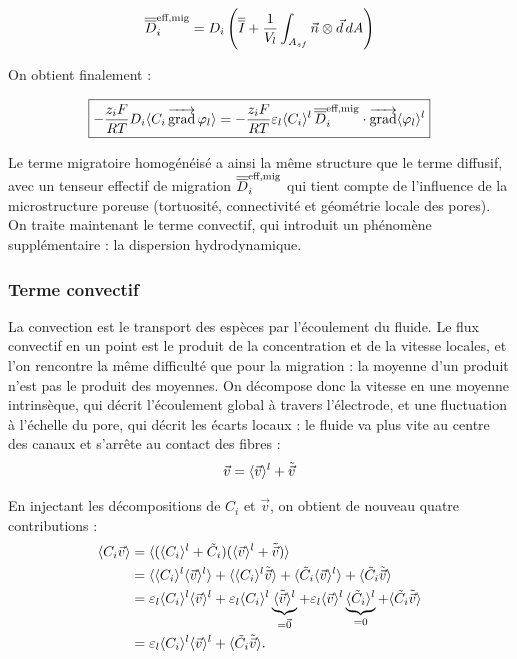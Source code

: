 \begin{equation}
\overline{\overline{D}}_i^{\text{eff,mig}} = D_i \left(\overline{\overline{I}} + \frac{1}{V_l}\int_{A_{sf}} \vec{n}\otimes\vec{d}\, dA \right)
\end{equation}

On obtient finalement :

\begin{equation}
\boxed{-\frac{z_i F}{RT} D_i \langle C_i \mathop{\overrightarrow{\operatorname{grad}}}\nolimits\varphi_l \rangle
= -\frac{z_i F}{RT} \varepsilon_l \langle C_i \rangle^l\, \overline{\overline{D}}_i^{\text{eff,mig}}\cdot\mathop{\overrightarrow{\operatorname{grad}}}\nolimits\langle \varphi_l \rangle^l}
\label{eq:mig_eff}
\end{equation}

Le terme migratoire homogénéisé a ainsi la même structure que le terme
diffusif, avec un tenseur effectif de migration $\overline{\overline{D}}_i^{\text{eff,mig}}$
qui tient compte de l'influence de la microstructure poreuse
(tortuosité, connectivité et géométrie locale des pores). On traite maintenant
le terme convectif, qui introduit un phénomène supplémentaire :
la dispersion hydrodynamique.
\subsubsection*{Terme convectif}

La convection est le transport des espèces par l'écoulement du fluide. Le
flux convectif en un point est le produit de la concentration et de la
vitesse locales, et l'on rencontre la même difficulté que pour la migration :
la moyenne d'un produit n'est pas le produit des moyennes. On décompose donc
la vitesse en une moyenne intrinsèque, qui décrit l'écoulement global à
travers l'électrode, et une fluctuation à l'échelle du pore, qui décrit les
écarts locaux : le fluide va plus vite au centre des canaux et s'arrête au
contact des fibres :
\begin{equation}
\vec{v} = \langle \vec{v} \rangle^l + \tilde{\vec{v}}
\end{equation}

En injectant les décompositions de $C_i$ et $\vec{v}$, on obtient de nouveau
quatre contributions :
\begin{align}
\langle C_i \vec{v} \rangle
&= \langle (\langle C_i \rangle^l + \tilde{C}_i)(\langle \vec{v} \rangle^l + \tilde{\vec{v}}) \rangle \notag\\
&= \langle \langle C_i \rangle^l \langle \vec{v} \rangle^l \rangle
+ \langle \langle C_i \rangle^l \tilde{\vec{v}} \rangle
+ \langle \tilde{C}_i \langle \vec{v} \rangle^l \rangle
+ \langle \tilde{C}_i \tilde{\vec{v}} \rangle \notag\\
&= \varepsilon_l \langle C_i \rangle^l \langle \vec{v} \rangle^l
+ \varepsilon_l \langle C_i \rangle^l \underbrace{\langle \tilde{\vec{v}} \rangle^l}_{=\vec{0}}
+ \varepsilon_l \langle \vec{v} \rangle^l \underbrace{\langle \tilde{C}_i \rangle^l}_{=0}
+ \langle \tilde{C}_i \tilde{\vec{v}} \rangle \notag\\
&= \varepsilon_l \langle C_i \rangle^l \langle \vec{v} \rangle^l
+ \langle \tilde{C}_i \tilde{\vec{v}} \rangle.
\end{align}

